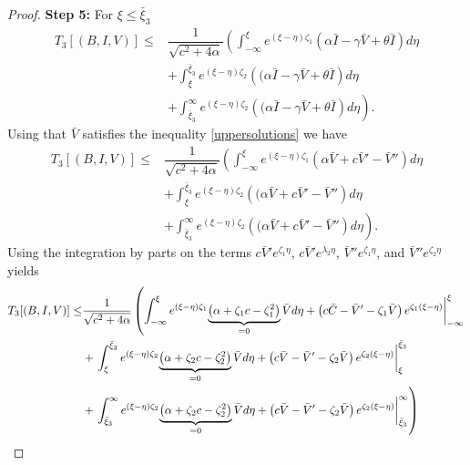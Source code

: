 \documentclass[11pt]{article}
\theoremstyle{definition}
\begin{document}
{\begin{proof}
\textbf{Step 5:} 
For $\xi \le \bar{\xi}_3$  \begin{align}
        T_3[(B,I,V)] \le & \dfrac{1}{\sqrt{c^2+4 \alpha}} \left( \int_{-\infty}^{\xi} e^{(\xi- \eta)\zeta_1} {\left(\alpha \bar I-\gamma\bar V +\theta\bar I \right)}d \eta \right. \\ & + \left. \int_{\xi}^{\bar{\xi}_3} e^{(\xi- \eta)\zeta_2} {\left((\alpha \bar I-\gamma\bar V +\theta\bar I \right)}d \eta \right. \\&+ \left. \int_{\bar\xi_3}^{\infty} e^{(\xi- \eta)\zeta_2} {\left((\alpha \bar I-\gamma\bar V +\theta\bar I  \right)}d \eta \right).
    \end{align}
Using that $\bar{V}$ satisfies the inequality \eqref{uppersolutions} we have 
\begin{align}
        T_3[(B,I,V)] \le & \dfrac{1}{\sqrt{c^2+4 \alpha}} \left( \int_{-\infty}^{\xi} e^{(\xi- \eta)\zeta_1} {\left(\alpha \bar V+ c\bar V'-\bar V'' \right)}d \eta \right. \\ & + \left. \int_{\xi}^{\bar{\xi}_3} e^{(\xi- \eta)\zeta_2} {\left((\alpha \bar V+ c\bar V'-\bar V'' \right)}d \eta \right. \\&+ \left. \int_{\bar\xi_3}^{\infty} e^{(\xi- \eta)\zeta_2} {\left((\alpha \bar V+ c\bar V'-\bar V'' \right)}d \eta \right). \end{align}
Using the integration by parts on the terms $c \bar{V}'e^{\zeta_1\eta}$, $c \bar{V}'e^{\lambda_2\eta}$, $\bar{V}''e^{\zeta_1\eta}$, and $\bar{V}''e^{\zeta_2\eta}$
 yields \begin{align}
        T_3[(B,I,V)] \le & \dfrac{1}{\sqrt{c^2+4 \alpha}} \left( \int_{-\infty}^{\xi} e^{(\xi- \eta)\zeta_1} {\underbrace{\left(\alpha + \zeta_1 c- \zeta^2_1 \right)}_{=0}\bar{V}}d\eta + \left(c \bar{C}-  \bar V ' - \zeta_1  \bar{V} \right) e^{\zeta_1(\xi- \eta)}\bigg{|}^\xi_{- \infty}  \right. \\ & + \left. \int_{\xi}^{\bar{\xi}_3} e^{(\xi- \eta)\zeta_2} {\underbrace{\left(\alpha + \zeta_2 c- \zeta^2_2 \right)}_{=0}\bar{V}}d\eta + \left(c \bar{V}-  \bar V ' - \zeta_2  \bar{V}\right) e^{\zeta_2(\xi- \eta)}\bigg{|}^{\bar{\xi}_3}_{ \xi}  \right. \\&+ \left. \int_{\bar\xi_3}^{\infty} e^{(\xi- \eta)\zeta_2} {\underbrace{\left(\alpha + \zeta_2 c- \zeta^2_2 \right)}_{=0}\bar{V}}d\eta + \left(c \bar{V}-  \bar V ' - \zeta_2  \bar{V} \right) e^{\zeta_2(\xi- \eta)}\bigg{|}^{\infty}_{ \bar\xi_3} \right) \end{align}


\end{proof}}
\end{document}
